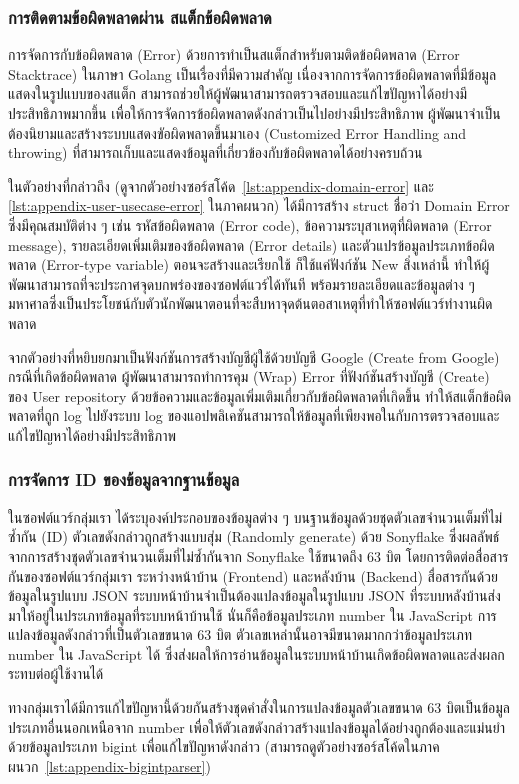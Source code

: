\documentclass[12pt,one side,openright,a4paper]{cpe-thesis-th}
\newcommand{\thaijustify}[1]{%
  \par\hspace{30pt}\justifying
  #1
}
\begin{document}
\subsubsection{การติดตามข้อผิดพลาดผ่าน สแต็กข้อผิดพลาด}
\thaijustify{
  การจัดการกับข้อผิดพลาด (Error) ด้วยการทำเป็นสแต็กสำหรับตามติดข้อผิดพลาด (Error Stacktrace) ในภาษา Golang เป็นเรื่องที่มีความสำคัญ เนื่องจากการจัดการข้อผิดพลาดที่มีข้อมูลแสดงในรูปแบบของสแต็ก สามารถช่วยให้ผู้พัฒนาสามารถตรวจสอบและแก้ไขปัญหาได้อย่างมีประสิทธิภาพมากขึ้น เพื่อให้การจัดการข้อผิดพลาดดังกล่าวเป็นไปอย่างมีประสิทธิภาพ ผู้พัฒนาจำเป็นต้องนิยามและสร้างระบบแสดงขัอผิดพลาดขึ้นมาเอง (Customized Error Handling and throwing) ที่สามารถเก็บและแสดงข้อมูลที่เกี่ยวข้องกับข้อผิดพลาดได้อย่างครบถ้วน
}
\thaijustify{
  ในตัวอย่างที่กล่าวถึง (ดูจากตัวอย่างซอร์สโค้ด~\ref{lst:appendix-domain-error} และ \ref{lst:appendix-user-usecase-error} ในภาคผนวก) ได้มีการสร้าง struct ชื่อว่า Domain Error ซึ่งมีคุณสมบัติต่าง ๆ เช่น รหัสข้อผิดพลาด (Error code), ข้อความระบุสาเหตุที่ผิดพลาด (Error message), รายละเอียดเพิ่มเติมของข้อผิดพลาด (Error details) และตัวแปรข้อมูลประเภทข้อผิดพลาด (Error-type variable) ตอนจะสร้างและเรียกใช้ ก็ใช้แค่ฟังก์ชัน New สิ่งเหล่านี้ ทำให้ผู้พัฒนาสามารถที่จะประกาศจุดบกพร่องของซอฟต์แวร์ได้ทันที พร้อมรายละเอียดและข้อมูลต่าง ๆ มหาศาลซึ่งเป็นประโยชน์กับตัวนักพัฒนาตอนที่จะสืบหาจุดต้นตอสาเหตุที่ทำให้ซอฟต์แวร์ทำงานผิดพลาด
}
\thaijustify{
  จากตัวอย่างที่หยิบยกมาเป็นฟังก์ชันการสร้างบัญชีผู้ใช้ด้วยบัญชี Google (Create from Google) กรณีที่เกิดข้อผิดพลาด ผู้พัฒนาสามารถทำการคุม (Wrap) Error ที่ฟังก์ชันสร้างบัญชี (Create) ของ User repository ด้วยข้อความและข้อมูลเพิ่มเติมเกี่ยวกับข้อผิดพลาดที่เกิดขึ้น ทำให้สแต็กข้อผิดพลาดที่ถูก log ไปยังระบบ log ของแอปพลิเคชันสามารถให้ข้อมูลที่เพียงพอในกับการตรวจสอบและแก้ไขปัญหาได้อย่างมีประสิทธิภาพ
}
\subsubsection{การจัดการ ID ของข้อมูลจากฐานข้อมูล}
\thaijustify{
  ในซอฟต์แวร์กลุ่มเรา ได้ระบุองค์ประกอบของข้อมูลต่าง ๆ บนฐานข้อมูลด้วยชุดตัวเลขจำนวนเต็มที่ไม่ซ้ำกัน (ID) ตัวเลขดังกล่าวถูกสร้างแบบสุ่ม (Randomly generate) ด้วย Sonyflake ซึ่งผลลัพธ์จากการสร้างชุดตัวเลขจำนวนเต็มที่ไม่ซ้ำกันจาก Sonyflake ใช้ขนาดถึง 63 บิต โดยการติดต่อสื่อสารกันของซอฟต์แวร์กลุ่มเรา ระหว่างหน้าบ้าน (Frontend) และหลังบ้าน (Backend) สื่อสารกันด้วยข้อมูลในรูปแบบ JSON ระบบหน้าบ้านจำเป็นต้องแปลงข้อมูลในรูปแบบ JSON ที่ระบบหลังบ้านส่งมาให้อยู่ในประเภทข้อมูลที่ระบบหน้าบ้านใช้ นั่นก็คือข้อมูลประเภท number ใน JavaScript การแปลงข้อมูลดังกล่าวที่เป็นตัวเลขขนาด 63 บิต ตัวเลขเหล่านั้นอาจมีขนาดมากกว่าข้อมูลประเภท number ใน JavaScript ได้ ซึ่งส่งผลให้การอ่านข้อมูลในระบบหน้าบ้านเกิดข้อผิดพลาดและส่งผลกระทบต่อผู้ใช้งานได้
}
\thaijustify{
  ทางกลุ่มเราได้มีการแก้ไขปัญหานี้ด้วยกันสร้างชุดคำสั่งในการแปลงข้อมูลตัวเลขขนาด 63 บิตเป็นข้อมูลประเภทอื่นนอกเหนือจาก number เพื่อให้ตัวเลขดังกล่าวสร้างแปลงข้อมูลได้อย่างถูกต้องและแม่นยำ ด้วยข้อมูลประเภท bigint เพื่อแก้ไขปัญหาดังกล่าว (สามารถดูตัวอย่างซอร์สโค้ดในภาคผนวก~\ref{lst:appendix-bigintparser})
}
\end{document}
